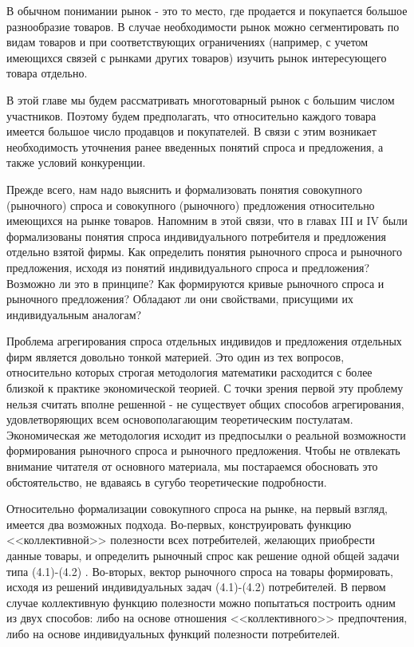 \documentclass[12pt, 4paper]{book}
\begin{document}
{В обычном понимании рынок - это то место, где продается и покупается большое разнообразие товаров. В случае необходимости рынок можно сегментировать по видам товаров и при соответствующих ограничениях (например, с учетом имеющихся связей с рынками других товаров) изучить рынок интересующего товара отдельно.
\par

В этой главе мы будем рассматривать многотоварный рынок с большим числом участников. Поэтому будем предполагать, что относительно каждого товара имеется большое число продавцов и покупателей. В связи с этим возникает необходимость уточнения ранее введенных понятий спроса и предложения, а также условий конкуренции.
\par

Прежде всего, нам надо выяснить и формализовать понятия совокупного (рыночного) спроса и совокупного (рыночного) предложения относительно имеющихся на рынке товаров. Напомним в этой связи, что в главах III и IV были формализованы понятия спроса индивидуального потребителя и предложения отдельно взятой фирмы. Как определить понятия рыночного спроса и рыночного предложения, исходя из понятий индивидуального спроса и предложения? Возможно ли это в принципе? Как формируются кривые рыночного спроса и рыночного предложения? Обладают ли они свойствами, присущими их индивидуальным аналогам?
\par

Проблема агрегирования спроса отдельных индивидов и предложения отдельных фирм является довольно тонкой материей. Это один из тех вопросов, относительно которых строгая методология математики расходится с более близкой к практике экономической теорией. С точки зрения первой эту проблему нельзя считать вполне решенной - не существует общих способов агрегирования, удовлетворяющих всем основополагающим теоретическим постулатам. Экономическая же методология исходит из предпосылки о реальной возможности формирования рыночного спроса и рыночного предложения. Чтобы не отвлекать внимание читателя от основного материала, мы постараемся обосновать это обстоятельство, не вдаваясь в сугубо теоретические подробности.
\par

Относительно формализации совокупного спроса на рынке, на первый взгляд, имеется два возможных подхода. Во-первых, конструировать функцию <<коллективной>> полезности всех потребителей, желающих приобрести данные товары, и определить рыночный спрос как решение одной общей задачи типа (4.1)-(4.2) . Во-вторых, вектор рыночного спроса на товары формировать, исходя из решений индивидуальных задач (4.1)-(4.2) потребителей. В первом случае коллективную функцию полезности можно попытаться построить одним из двух способов: либо на основе отношения <<коллективного>> предпочтения, либо на основе индивидуальных функций полезности потребителей.
\par

}
\end{document}
